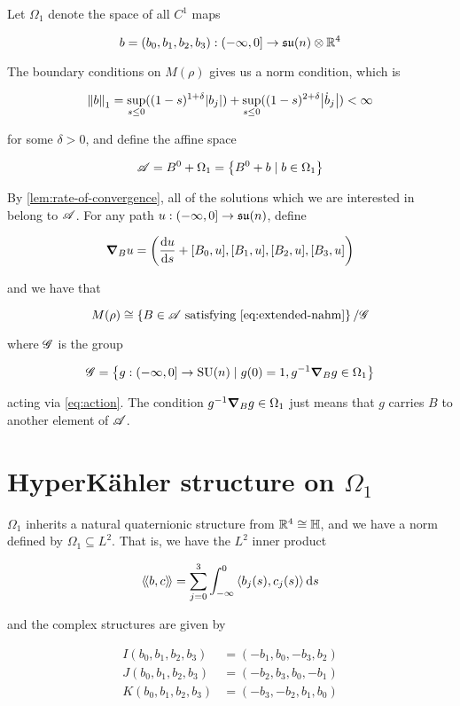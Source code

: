 \documentclass{report}
\DeclareMathOperator{\SU}{SU}
\newcommand{\su}{\mathfrak{su}}
\newcommand{\iinner}[1]{\left\langle\!\left\langle #1 \right\rangle\!\right\rangle}
\begin{document}
Let \(\Omega_1\) denote the space of all \(C^1\) maps

\[b = (b_0, b_1, b_2, b_3) : \Ioc{-\infty, 0} \to \su(n) \otimes \R^4\]

The boundary conditions on \(M(\rho)\) gives us a norm condition, which is

\[\norm{b}_1 = \sup_{s \le 0}((1-s)^{1+\delta}\abs{b_j}) + \sup_{s\le0}((1-s)^{2+\delta}\abs{\dot b_j}) < \infty\]

for some \(\delta > 0\), and define the affine space

\[\mathscr{A} = B^0 + \Omega_1 = \left\{B^0 + b \mid b \in \Omega_1\right\}\]

By \cref{lem:rate-of-convergence}, all of the solutions which we are interested in belong to \(\mathscr{A}\). For any path \(u : \Ioc{-\infty, 0} \to \su(n)\), define

\[\grad_B u = \left(\dv{u}{s} + [B_0, u], [B_1, u], [B_2, u], [B_3, u]\right)\]

and we have that \cite[Proposition 3.7]{kronheimer_hyper-kahlerian_1990}

\[M(\rho) \cong \left\{B \in \msA \text{ satisfying \cref{eq:extended-nahm}}\right\}/\msG\]

where \(\mathscr{G}\) is the group

\[\msG = \left\{g : \Ioc{-\infty, 0} \to \SU(n) \mid g(0) = 1, g^{-1}\grad_Bg \in \Omega_1\right\}\]

acting via \cref{eq:action}. The condition \(g^{-1}\grad_Bg \in \Omega_1\) just means that \(g\) carries \(B\) to another element of \(\mathscr{A}\).

\section{HyperK\"ahler structure on \(\Omega_1\)}

\(\Omega_1\) inherits a natural quaternionic structure from \(\mathbb{R}^4 \cong \mathbb{H}\), and we have a norm defined by \(\Omega_1 \subseteq L^2\). That is, we have the \(L^2\) inner product

\[\iinner{b, c} = \sum_{j=0}^3\int_{-\infty}^0 \inner{b_j(s), c_j(s)}\dd s\]

and the complex structures are given by

\begin{align*}
    I(b_0, b_1, b_2, b_3) &= (-b_1, b_0, -b_3, b_2) \\
    J(b_0, b_1, b_2, b_3) &= (-b_2, b_3, b_0, -b_1) \\
    K(b_0, b_1, b_2, b_3) &= (-b_3, -b_2, b_1, b_0)
\end{align*}
\end{document}
